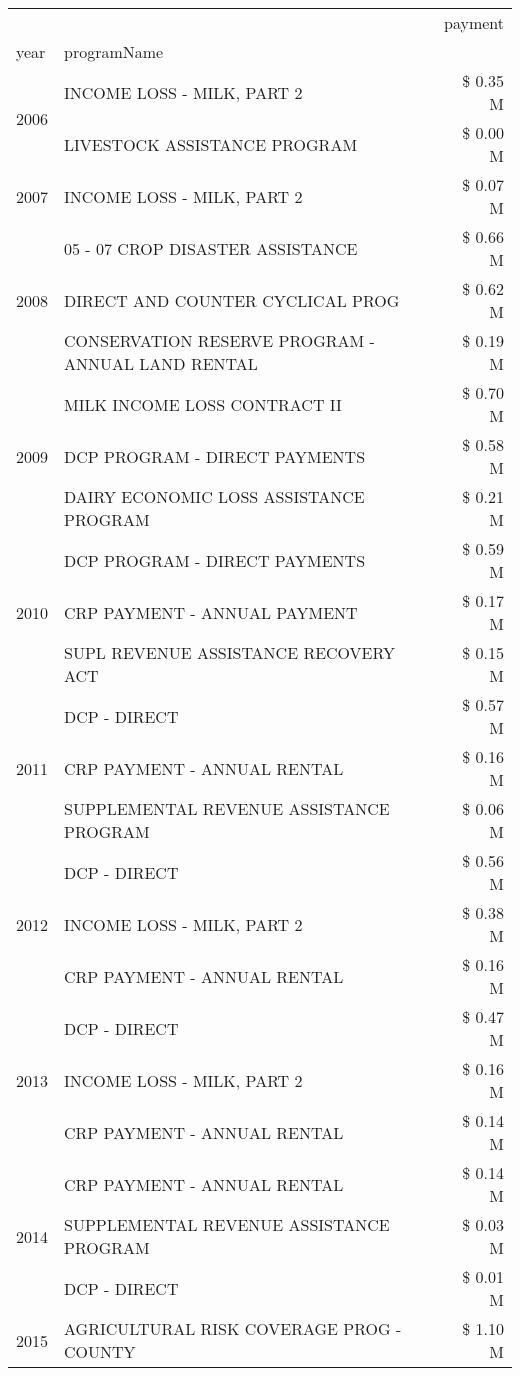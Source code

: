 \begin{tabular}{llr}
\toprule
 &  & payment \\
year & programName &  \\
\midrule
\multirow[t]{2}{*}{2006} & INCOME LOSS - MILK, PART 2 & \$ 0.35 M \\
 & LIVESTOCK ASSISTANCE PROGRAM & \$ 0.00 M \\
\cline{1-3}
2007 & INCOME LOSS - MILK, PART 2 & \$ 0.07 M \\
\cline{1-3}
\multirow[t]{3}{*}{2008} & 05 - 07 CROP DISASTER ASSISTANCE & \$ 0.66 M \\
 & DIRECT AND COUNTER CYCLICAL PROG & \$ 0.62 M \\
 & CONSERVATION RESERVE PROGRAM - ANNUAL LAND RENTAL & \$ 0.19 M \\
\cline{1-3}
\multirow[t]{3}{*}{2009} & MILK INCOME LOSS CONTRACT II & \$ 0.70 M \\
 & DCP PROGRAM - DIRECT PAYMENTS & \$ 0.58 M \\
 & DAIRY ECONOMIC LOSS ASSISTANCE PROGRAM & \$ 0.21 M \\
\cline{1-3}
\multirow[t]{3}{*}{2010} & DCP PROGRAM - DIRECT PAYMENTS & \$ 0.59 M \\
 & CRP PAYMENT - ANNUAL PAYMENT & \$ 0.17 M \\
 & SUPL REVENUE ASSISTANCE RECOVERY ACT & \$ 0.15 M \\
\cline{1-3}
\multirow[t]{3}{*}{2011} & DCP - DIRECT & \$ 0.57 M \\
 & CRP PAYMENT - ANNUAL RENTAL & \$ 0.16 M \\
 & SUPPLEMENTAL REVENUE ASSISTANCE PROGRAM & \$ 0.06 M \\
\cline{1-3}
\multirow[t]{3}{*}{2012} & DCP - DIRECT & \$ 0.56 M \\
 & INCOME LOSS - MILK, PART 2 & \$ 0.38 M \\
 & CRP PAYMENT - ANNUAL RENTAL & \$ 0.16 M \\
\cline{1-3}
\multirow[t]{3}{*}{2013} & DCP - DIRECT & \$ 0.47 M \\
 & INCOME LOSS - MILK, PART 2 & \$ 0.16 M \\
 & CRP PAYMENT - ANNUAL RENTAL & \$ 0.14 M \\
\cline{1-3}
\multirow[t]{3}{*}{2014} & CRP PAYMENT - ANNUAL RENTAL & \$ 0.14 M \\
 & SUPPLEMENTAL REVENUE ASSISTANCE PROGRAM & \$ 0.03 M \\
 & DCP - DIRECT & \$ 0.01 M \\
\cline{1-3}
\multirow[t]{3}{*}{2015} & AGRICULTURAL RISK COVERAGE PROG - COUNTY & \$ 1.10 M \\

\end{tabular}
